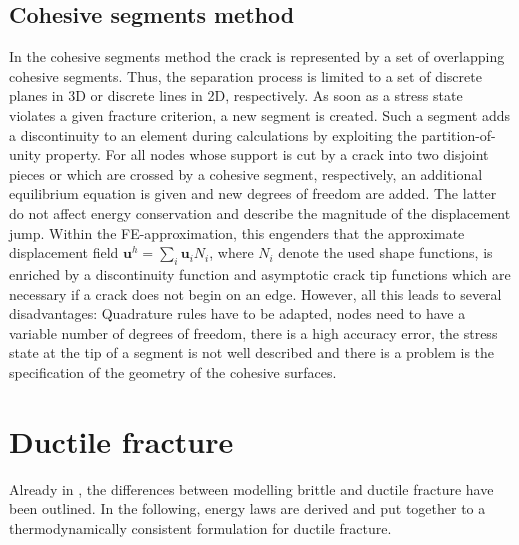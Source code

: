 \subsection{Cohesive segments method} \label{appsec:cohes}
In the cohesive segments method the crack is represented by a set of overlapping cohesive segments. Thus, the separation process is limited to a set of discrete planes in 3D or discrete lines in 2D, respectively. As soon as a stress state violates a given fracture criterion, a new segment is created. Such a segment adds a discontinuity to an element during calculations by exploiting the partition-of-unity property. For all nodes whose support is cut by a crack into two disjoint pieces or which are crossed by a cohesive segment, respectively, an additional equilibrium equation is given and new degrees of freedom are added. The latter do not affect energy conservation and describe the magnitude of the displacement jump. Within the FE-approximation, this engenders that the approximate displacement field $\mathbf{u}^{h}=\sum_{i}\mathbf{u}_{i}N_{i}$, where $N_{i}$ denote the used shape functions, is enriched by a discontinuity function and asymptotic crack tip functions which are necessary if a crack does not begin on an edge. However, all this leads to several disadvantages: Quadrature rules have to be adapted, nodes need to have a variable number of degrees of freedom, there is a high accuracy error, the stress state at the tip of a segment is not well described and there is a problem is the specification of the geometry of the cohesive surfaces. \cite{02_SotA_cohes}\cite{01_SotA_cohes_dyn}

\section{Ductile fracture} \label{appsec:ductile}
Already in , the differences between modelling brittle and ductile fracture have been outlined. In the following, energy laws are derived and put together to a thermodynamically consistent formulation for ductile fracture.

